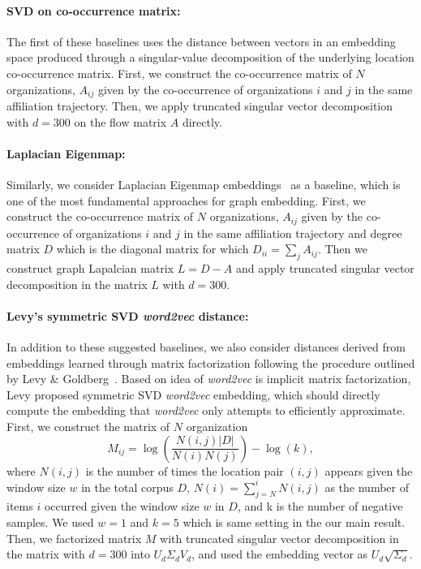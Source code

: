 \documentclass[12pt,a4paper]{article}
\begin{document}
\vspace{-0.5cm}
\paragraph{SVD on co-occurrence matrix:}The first of these baselines uses the distance between vectors in an embedding space produced through a singular-value decomposition of the underlying location co-occurrence matrix. First, we construct the co-occurrence matrix of $N$ organizations, $A_{ij}$ given by the co-occurrence of organizations $i$ and $j$ in the same affiliation trajectory.
Then, we apply truncated singular vector decomposition with $d=300$ on the flow matrix $A$ directly.

\vspace{-0.3cm}
\paragraph{Laplacian Eigenmap:} Similarly, we consider Laplacian Eigenmap embeddings~\autocite{belkin2003laplacian} as a baseline, which is one of the most fundamental approaches for graph embedding. First, we construct the co-occurrence matrix of $N$ organizations, $A_{ij}$ given by the co-occurrence of organizations $i$ and $j$ in the same affiliation trajectory and degree matrix $D$ which is the diagonal matrix for which $D_{ii}=\sum_j {A_{ij}}$. Then we construct graph Lapalcian matrix $L = D-A$  and apply truncated singular vector decomposition in the matrix $L$ with $d=300$.

\vspace{-0.3cm}
\paragraph{Levy's  symmetric SVD \textit{word2vec} distance:} In addition to these suggested baselines, we also consider distances derived from embeddings learned through matrix factorization following the procedure outlined by Levy \& Goldberg~\autocite{levy2014neural}. Based on idea of \textit{word2vec} is implicit matrix factorization, Levy proposed symmetric SVD \textit{word2vec} embedding, which should directly compute the embedding that \textit{word2vec} only attempts to efficiently approximate. First, we construct the matrix of $N$ organization
\begin{equation}
	M_{ij} = \log\left(\frac{N(i,j) |D|}{N(i) N(j)}\right) - \log(k),
\end{equation}
where $N(i,j)$ is the number of times the location pair $(i,j)$ appears given the window size $w$ in the total corpus $D$, $N(i)=\sum_{j=N}^i N(i,j)$ as the number of items $i$ occurred given the window size $w$ in $D$, and k is the number of negative samples. We used $w=1$ and $k=5$ which is same setting in the our main result. Then, we factorized matrix $M$ with truncated singular vector decomposition in the matrix with $d=300$ into $U_d \Sigma_d V_d$, and used the embedding vector as $U_d\sqrt{\Sigma_d}$.
\end{document}
